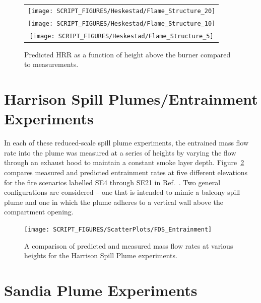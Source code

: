 \begin{figure}[p]
\begin{center}
\begin{tabular}{c}
\texttt{[image: SCRIPT\_FIGURES/Heskestad/Flame\_Structure\_20]} \\
\texttt{[image: SCRIPT\_FIGURES/Heskestad/Flame\_Structure\_10]} \\
\texttt{[image: SCRIPT\_FIGURES/Heskestad/Flame\_Structure\_5]}
\end{tabular}
\end{center}
\caption[Predicted HRR as a function of height above the burner]{Predicted HRR as a function of height above the burner compared to measurements.}
\label{Flame_Structure}
\end{figure}



\clearpage

\section{Harrison Spill Plumes/Entrainment Experiments}
\label{Harrison_Spill_Plumes}
\label{Entrainment}

In each of these reduced-scale spill plume experiments, the entrained mass flow rate into the plume was measured at a series of heights by varying the flow through an exhaust hood to maintain a constant smoke layer depth.  Figure~\ref{Entrainment_Plot} compares measured and predicted entrainment rates at five different elevations for the fire scenarios labelled SE4 through SE21 in Ref.~\cite{Harrison:2009}. Two general configurations are considered -- one that is intended to mimic a balcony spill plume and one in which the plume adheres to a vertical wall above the compartment opening.

\begin{figure}[h]
\begin{center}
\texttt{[image: SCRIPT\_FIGURES/ScatterPlots/FDS\_Entrainment]}
\caption[Summary of plume entrainment predictions]{A comparison of predicted and measured mass flow rates at various heights for the Harrison Spill Plume experiments.}
\label{Entrainment_Plot}
\end{center}
\end{figure}




\clearpage

\section{Sandia Plume Experiments}

